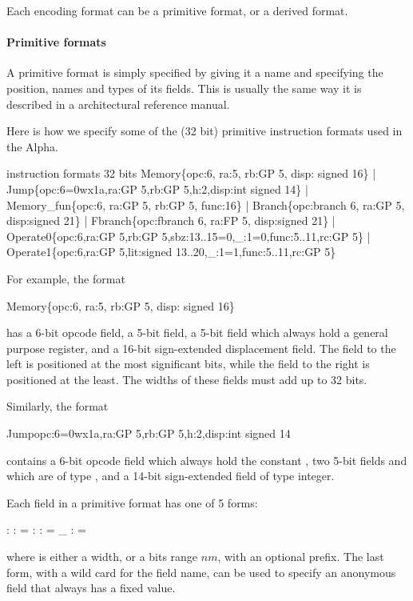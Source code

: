Each encoding format can be a primitive format, or a derived format.

\paragraph{Primitive formats}

A primitive format is simply specified by giving it a name and specifying
the position, names and types of its fields.   This is usually the same
way it is described in a architectural reference manual.


Here is how we specify some of the (32 bit) primitive instruction formats 
used in the Alpha. 
\begin{SML}
   instruction formats 32 bits
     Memory\{opc:6, ra:5, rb:GP 5, disp: signed 16\} 
   | Jump\{opc:6=0wx1a,ra:GP 5,rb:GP 5,h:2,disp:int signed 14\}  
   | Memory_fun\{opc:6, ra:GP 5, rb:GP 5, func:16\}     
   | Branch\{opc:branch 6, ra:GP 5, disp:signed 21\}         
   | Fbranch\{opc:fbranch 6, ra:FP 5, disp:signed 21\}        
   | Operate0\{opc:6,ra:GP 5,rb:GP 5,sbz:13..15=0,_:1=0,func:5..11,rc:GP 5\}
   | Operate1\{opc:6,ra:GP 5,lit:signed 13..20,_:1=1,func:5..11,rc:GP 5\} 
\end{SML}

For example, the format 
\begin{SML}
     Memory\{opc:6, ra:5, rb:GP 5, disp: signed 16\} 
\end{SML}
has a 6-bit opcode field, a 5-bit  field, a 5-bit 
field which always hold a general purpose register, and a 16-bit 
sign-extended displacement field.  The field to the left is positioned 
at the most significant bits, while the field to the right is positioned
at the least.  The widths of these fields must add up to 32 bits.


Similarly, the format 
\begin{SML}
  Jump{opc:6=0wx1a,ra:GP 5,rb:GP 5,h:2,disp:int signed 14}  
\end{SML}
contains a 6-bit opcode field which always hold the constant ,
two 5-bit fields  and  which are of type ,
and a 14-bit sign-extended field of type integer.

  Each field in a primitive format has one of 5 forms:
\begin{SML}
    :  
    :  =  
    :   
    :   =  
   _           :  =  
\end{SML}
where  is either a width, or a bits range 
$n$$m$,
with an optional  prefix.  The last form, with a wild card
for the field name, can be used to specify an anonymous field that
always has a fixed value.  


